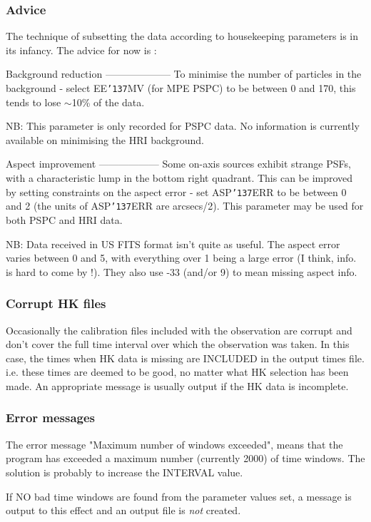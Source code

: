 \documentclass{book}
\renewcommand{\_}{{\tt\char'137}}     %
\begin{document}
\subsubsection{Advice}
The technique of subsetting the data according to housekeeping
parameters is in its infancy. The advice for now is :

Background reduction
--------------------
To minimise the number of particles in the background -
select EE\_MV (for MPE PSPC) to be between 0 and 170, this tends
to lose $\sim$10\% of the data.

NB: This parameter is only recorded for PSPC
data. No information is currently available on minimising the
HRI background.

Aspect improvement
------------------
Some on-axis sources exhibit strange PSFs, with a characteristic
lump in the bottom right quadrant. This can be improved by
setting constraints on the aspect error - set ASP\_ERR to be
between 0 and 2 (the units of ASP\_ERR are arcsecs/2). This
parameter may be used for both PSPC and HRI data.

NB: Data received in US FITS format isn't quite as useful.
The aspect error varies between 0 and 5, with everything over
1 being a large error (I think, info. is hard to come by !).
They also use -33 (and/or 9) to mean missing aspect info.

\subsubsection{Corrupt HK files}
Occasionally the calibration files included with the observation are
corrupt and don't cover the full time interval over which the
observation was taken. In this case, the times when HK data is missing
are INCLUDED in the output times file. i.e. these times are deemed to be
good, no matter what HK selection has been made. An appropriate message
is usually output if the HK data is incomplete.

\subsubsection{Error messages}
The error message "Maximum number of windows exceeded", means that
the program has exceeded a maximum number (currently 2000) of time
windows. The solution is probably to increase the INTERVAL value.

If NO bad time windows are found from the parameter values set, a
message is output to this effect and an output file is {\em not} created.
\end{document}

